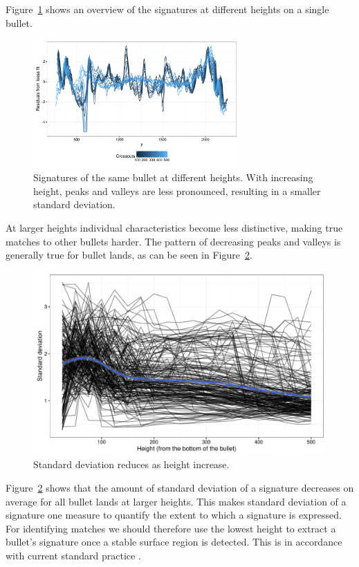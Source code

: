 \documentclass[aoas]{imsart}\usepackage[]{graphicx}\usepackage[]{color}
\newenvironment{knitrout}{}{} %
\begin{document}
%
Figure~\ref{fig:overview} shows an overview of the signatures at different heights on a single bullet. 
\begin{figure}[hbtp]
\begin{knitrout}
\color{fgcolor}
\includegraphics[width=0.7\textwidth]{one-bulletland-sd-1} 

\end{knitrout}
\caption{\label{fig:overview}Signatures of the same bullet at different heights.  With increasing height, peaks and valleys are less pronounced, resulting in a smaller standard deviation.}
\end{figure}
At larger heights  individual characteristics become less distinctive, making true matches to other bullets harder. The pattern of decreasing peaks and valleys is generally true for  bullet lands, as can be seen in Figure~\ref{fig:sds}. 
%
\begin{figure}[hbtp]
\centering
\begin{knitrout}
\color{fgcolor}
\includegraphics[width=.7\textwidth]{crosscuts-sd-1} 

\end{knitrout}
\caption{\label{fig:sds}Standard deviation reduces as height increase.}
\end{figure}
Figure~\ref{fig:sds} shows that the amount of standard deviation of a signature decreases on average for all bullet lands at larger heights.
This makes standard deviation of a signature one measure to quantify the extent to which a signature is expressed. For identifying matches we should therefore use the lowest height to extract a bullet's signature once a stable surface region is detected. This is in accordance with current standard practice \citep{afte:1992}.
\end{document}
